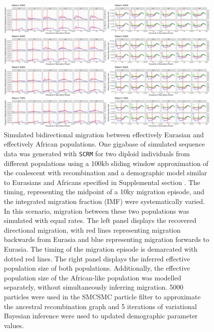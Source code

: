 \begin{figure}
	\centering
	\includegraphics[width=\textwidth]{plot/bidirectional_different_starts.pdf}
	\caption[Simulated bidirectional migration between effectively Eurasian and effectively African populations]{Simulated bidirectional migration between effectively Eurasian and effectively African populations. One gigabase of simulated sequence data was generated with {\tt SCRM} for two diploid individuals from different populations using a 100kb sliding window approximation of the coalescent with recombination and a demographic model similar to Eurasians and Africans specified in Supplemental section . The timing, representing the midpoint of a 10ky migration episode, and the integrated migration fraction (IMF) were systematically varied. In this scenario, migration between these two populations was simulated with equal rates. The left panel displays the recovered directional migration, with red lines representing migration backwards from Eurasia and blue representing migration forwards to Eurasia. The timing of the migration episode is demarcated with dotted red lines. The right panel displays the inferred effective population size of both populations. Additionally, the effective population size of the African-like population was modelled separately, without simultaneously inferring migration. 5000 particles were used in the SMCSMC particle filter to approximate the ancestral recombination graph and 5 iterations of variational Bayesian inference were used to updated demographic parameter values.}
	\label{fig:bisim}
\end{figure}



